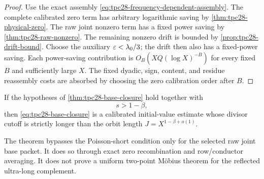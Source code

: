 \begin{proof}
Use the exact assembly
\eqref{eq:tpc28-frequency-dependent-assembly}.  The complete
calibrated zero term has arbitrary logarithmic saving by
\cref{thm:tpc28-physical-zero}.  The raw joint nonzero term has a fixed
power saving by \cref{thm:tpc28-raw-nonzero}.  The remaining nonzero
drift is bounded by \cref{prop:tpc28-drift-bound}.  Choose the
auxiliary $\varepsilon<\lambda_0/3$; the drift then also has a fixed-power
saving.  Each power-saving contribution is
$O_B\!\left(XQ(\log X)^{-B}\right)$ for every fixed $B$ and
sufficiently large $X$.
The fixed
dyadic, sign, content, and residue reassembly costs are absorbed by
choosing the zero calibration order after $B$.
\end{proof}

\begin{corollary}
\label{cor:tpc28-beyond-Poisson}
If the hypotheses of \cref{thm:tpc28-base-closure} hold together with
\begin{equation}
 s>1-\beta,
 \label{eq:tpc28-Poisson-long}
\end{equation}
then \eqref{eq:tpc28-base-closure} is a calibrated initial-value
estimate whose divisor cutoff is strictly longer than the orbit
length $J=X^{1-\beta+o(1)}$.
\end{corollary}

\begin{remark}
\label{rem:tpc28-bypassed-face}
The theorem bypasses the Poisson-short condition only for the selected
raw joint base packet.  It does so through exact zero recombination and
row/conductor averaging.  It does not prove a uniform two-point
M\"obius theorem for the reflected ultra-long complement.
\end{remark}
